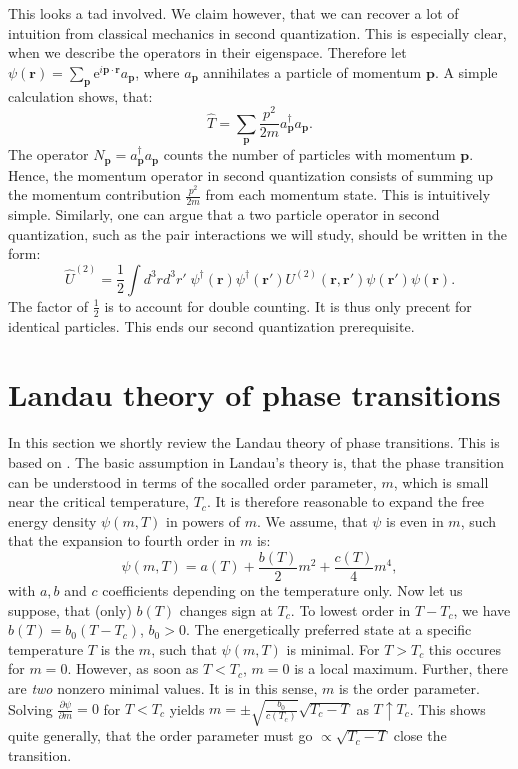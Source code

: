This looks a tad involved. We claim however, that we can recover a lot of intuition from classical mechanics in second quantization. This is especially clear, when we describe the operators in their eigenspace. Therefore let $\psi(\mathbf{r}) = \sum_{\mathbf{p}} \text{e}^{i\mathbf{p}\cdot \mathbf{r}} a_\mathbf{p}$, where $a_\mathbf{p}$ annihilates a particle of momentum $\mathbf{p}$. A simple calculation shows, that:
\begin{equation}
\hat{T} = \sum_\mathbf{p} \frac{p^2}{2m} a^\dagger_\mathbf{p}a_\mathbf{p}.
\end{equation}
The operator $N_\mathbf{p} = a^\dagger_\mathbf{p}a_\mathbf{p}$ counts the number of particles with momentum $\mathbf{p}$. Hence, the momentum operator in second quantization consists of summing up the momentum contribution $\frac{p^2}{2m}$ from each momentum state. This is intuitively simple. Similarly, one can argue that a two particle operator in second quantization, such as the pair interactions we will study, should be written in the form:
\begin{equation}
\hat{U}^{(2)} = \frac{1}{2}\int d^3 r d^3 r' \; \psi^\dagger(\mathbf{r}) \psi^\dagger(\mathbf{r}') U^{(2)}(\mathbf{r},\mathbf{r}')\psi(\mathbf{r}')\psi(\mathbf{r}). 
\label{eq.InteractionHamiltonain2ndQuantization} 
\end{equation}
The factor of $\frac{1}{2}$ is to account for double counting. It is thus only precent for identical particles. This ends our second quantization prerequisite. 

\section{Landau theory of phase transitions}
\label{sec.landauphasetransitions}
In this section we shortly review the Landau theory of phase transitions. This is based on \cite[pp. 86-88]{PlischkeStatPhys}. The basic assumption in Landau's theory is, that the phase transition can be understood in terms of the socalled order parameter, $m$, which is small near the critical temperature, $T_c$. It is therefore reasonable to expand the free energy density $\psi(m, T)$ in powers of $m$. We assume, that $\psi$ is even in $m$, such that the expansion to fourth order in $m$ is:
\begin{equation}
\psi(m, T) = a(T) + \frac{b(T)}{2}m^2 + \frac{c(T)}{4}m^4, 
\label{eq.freeenergydensity.mexpansion}
\end{equation}
with $a, b$ and $c$ coefficients depending on the temperature only. Now let us suppose, that (only) $b(T)$ changes sign at $T_c$. To lowest order in $T - T_c$, we have $b(T) = b_0 (T - T_c)$, $b_0 > 0$. The energetically preferred state at a specific temperature $T$ is the $m$, such that $\psi(m, T)$ is minimal. For $T > T_c$ this occures for $m = 0$. However, as soon as $T < T_c$, $m = 0$ is a local maximum. Further, there are \textit{two} nonzero minimal values. It is in this sense, $m$ is the order parameter. Solving $\frac{\partial \psi}{\partial m} = 0$ for $T < T_c$ yields $m = \pm \sqrt{\frac{b_0}{c(T_c)}}\sqrt{T_c-T}$ as $T \uparrow T_c$. This shows quite generally, that the order parameter must go $\propto \sqrt{T_c - T}$ close the transition. 

